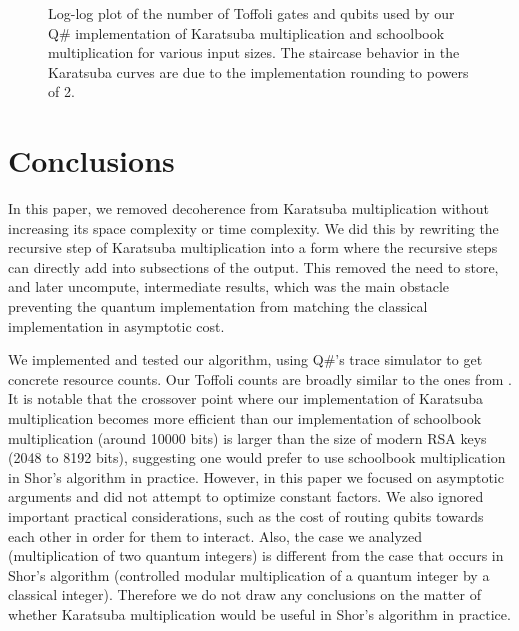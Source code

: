 \documentclass[onecolumn,unpublished]{quantumarticle}
\begin{document}
\begin{figure}
    \centering
    \caption{
    \label{fig:data}
    Log-log plot of the number of Toffoli gates and qubits used by our Q\# implementation of Karatsuba multiplication and schoolbook multiplication for various input sizes.
    The staircase behavior in the Karatsuba curves are due to the implementation rounding to powers of 2.
    }
\end{figure}

\section{Conclusions}
\label{sec:conclusion}

In this paper, we removed decoherence from Karatsuba multiplication without increasing its space complexity or time complexity.
We did this by rewriting the recursive step of Karatsuba multiplication into a form where the recursive steps can directly add into subsections of the output.
This removed the need to store, and later uncompute, intermediate results, which was the main obstacle preventing the quantum implementation from matching the classical implementation in asymptotic cost.

We implemented and tested our algorithm, using Q\#'s trace simulator to get concrete resource counts.
Our Toffoli counts are broadly similar to the ones from \cite{parent2017karatsuba}.
It is notable that the crossover point where our implementation of Karatsuba multiplication becomes more efficient than our implementation of schoolbook multiplication (around 10000 bits) is larger than the size of modern RSA keys (2048 to 8192 bits), suggesting one would prefer to use schoolbook multiplication in Shor's algorithm in practice.
However, in this paper we focused on asymptotic arguments and did not attempt to optimize constant factors.
We also ignored important practical considerations, such as the cost of routing qubits towards each other in order for them to interact.
Also, the case we analyzed (multiplication of two quantum integers) is different from the case that occurs in Shor's algorithm (controlled modular multiplication of a quantum integer by a classical integer).
Therefore we do not draw any conclusions on the matter of whether Karatsuba multiplication would be useful in Shor's algorithm in practice.
\end{document}
